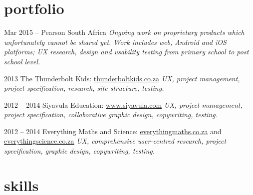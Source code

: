 \documentclass[]{friggeri-cv} %
\begin{document}
\section{portfolio}
\begin{sitelist}


\site
{Mar 2015 --}
{Pearson South Africa}
{}
{\emph{Ongoing work on proprietary products which unfortunately cannot be shared yet. Work includes web, Android and iOS platforms; UX research, design and usability testing from primary school to post school level.}  }





\site
{2013}
{The Thunderbolt Kids: \href{http://thunderboltkids.co.za}{\underline{thunderboltkids.co.za}}}
{}
{\emph{UX, project management, project specification, research, site structure, testing.}}


\site
{2012 -- 2014}
{Siyavula Education: \href{https://web.archive.org/web/20140723153945/http://www.siyavula.com}{\underline{www.siyavula.com}}}
{}
{\emph{UX, project management, project specification, collaborative graphic design, copywriting, testing.}}


\site
{2012 -- 2014}
{Everything Maths and Science: \href{http://www.everythingmaths.co.za}{\underline{everythingmaths.co.za}} and \href{http://www.everythingmaths.co.za}{\underline{everythingscience.co.za}}}
{}
{\emph{UX, comprehensive user-centred research, project specification, graphic design, copywriting, testing.}}


\end{sitelist}


\section{skills}
\end{document}

